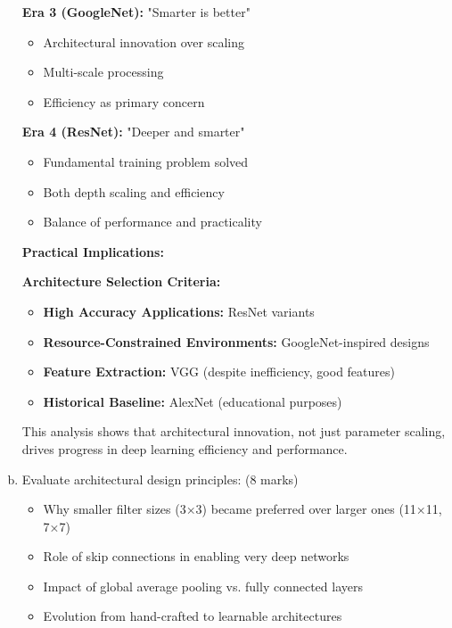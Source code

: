 \documentclass[12pt]{article}
\begin{document}
\begin{enumerate}[(a)]
{    \textbf{Era 3 (GoogleNet):} "Smarter is better"
    \begin{itemize}
        \item Architectural innovation over scaling
        \item Multi-scale processing
        \item Efficiency as primary concern
    \end{itemize}
    
    \textbf{Era 4 (ResNet):} "Deeper and smarter"
    \begin{itemize}
        \item Fundamental training problem solved
        \item Both depth scaling and efficiency
        \item Balance of performance and practicality
    \end{itemize}
    
    \textbf{Practical Implications:}
    
    \textbf{Architecture Selection Criteria:}
    \begin{itemize}
        \item \textbf{High Accuracy Applications:} ResNet variants
        \item \textbf{Resource-Constrained Environments:} GoogleNet-inspired designs
        \item \textbf{Feature Extraction:} VGG (despite inefficiency, good features)
        \item \textbf{Historical Baseline:} AlexNet (educational purposes)
    \end{itemize}
    
    This analysis shows that architectural innovation, not just parameter scaling, drives progress in deep learning efficiency and performance.
    }
    
    \item Evaluate architectural design principles: \hfill (8 marks)
    \begin{itemize}
        \item Why smaller filter sizes (3×3) became preferred over larger ones (11×11, 7×7)
        \item Role of skip connections in enabling very deep networks
        \item Impact of global average pooling vs. fully connected layers
        \item Evolution from hand-crafted to learnable architectures
    \end{itemize}
    

\end{enumerate}
\end{document}
